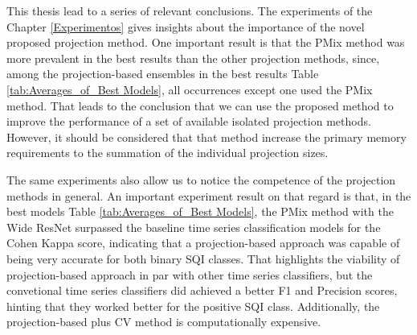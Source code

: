 
This thesis lead to a series of relevant conclusions. The experiments of the Chapter \ref{Experimentos} gives insights about the importance of the novel proposed projection method. One important result is that the \gls{PMix} method was more prevalent in the best results than the other projection methods, since, among the projection-based ensembles in the best results Table \ref{tab:Averages_of_Best Models}, all occurrences except one used the \gls{PMix} method. That leads to the conclusion that we can use the proposed method to improve the performance of a set of available isolated projection methods. However, it should be considered that that method increase the primary memory requirements to the summation of the individual projection sizes.	  

The same experiments also allow us to notice the competence of the projection methods in general. An important experiment result on that regard is that, in the best models Table \ref{tab:Averages_of_Best Models}, the \gls{PMix} method with the Wide ResNet surpassed the baseline time series classification models for the Cohen Kappa score, indicating that a projection-based approach was capable of being very accurate for both binary \gls{SQI} classes. That highlights the viability of projection-based approach in par with other time series classifiers, but the convetional time series classifiers did achieved a better F1 and Precision scores, hinting that they worked better for the positive \gls{SQI} class. Additionally, the projection-based plus \gls{CV} method is computationally expensive. 

